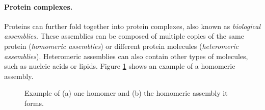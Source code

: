 \paragraph{Protein complexes.}
Proteins can further fold together into protein complexes, also known as \textit{biological assemblies}.
These assemblies can be composed of multiple copies of the same protein (\textit{homomeric assemblies}) or different protein molecules (\textit{heteromeric assemblies}).
Heteromeric assemblies can also contain other types of molecules, such as  nucleic acids or lipids. Figure \ref{assembly} shows an example of a homomeric assembly.
\begin{figure}[!h]
    \centering
    \hspace{0.3in}
    \caption{Example of (a) one homomer and  (b) the homomeric assembly it forms.}
    \label{assembly}
\end{figure}

